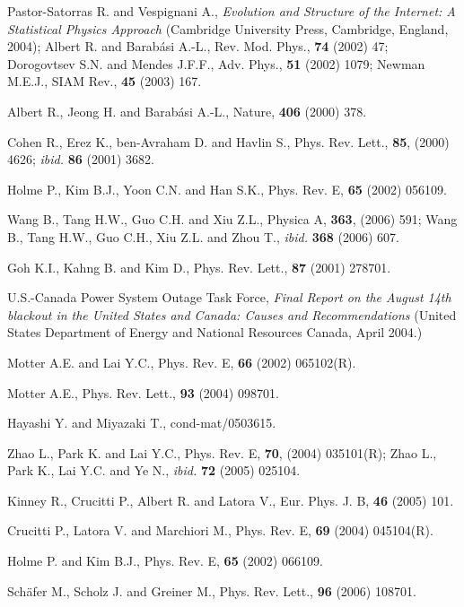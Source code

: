 \documentclass[doublecol]{epl2}
\begin{document}
\begin{thebibliography}{ref1}
Pastor-Satorras R. and Vespignani A., {\it Evolution and Structure
of the Internet: A Statistical Physics Approach} (Cambridge
University Press, Cambridge, England, 2004); Albert R. and
Barab\'{a}si A.-L., Rev. Mod. Phys., \textbf{74} (2002) 47;
Dorogovtsev S.N. and Mendes J.F.F., Adv. Phys., \textbf{51} (2002)
1079; Newman M.E.J., SIAM Rev., \textbf{45} (2003) 167.

Albert R., Jeong H. and Barab\'{a}si A.-L., Nature,
\textbf{406} (2000) 378.

Cohen R., Erez K., ben-Avraham D. and Havlin S., Phys.
Rev. Lett., \textbf{85}, (2000) 4626; {\it ibid.} \textbf{86} (2001)
3682.

Holme P., Kim B.J., Yoon C.N. and Han S.K., Phys. Rev.
E,
\textbf{65} (2002) 056109.

 Wang B., Tang H.W., Guo C.H. and Xiu Z.L.,
Physica A, \textbf{363}, (2006) 591; Wang B., Tang H.W., Guo C.H.,
Xiu Z.L. and Zhou T., {\it ibid.} \textbf{368} (2006) 607.

 Goh K.I., Kahng B. and Kim D., Phys. Rev. Lett.,
\textbf{87} (2001) 278701.

 U.S.-Canada Power System Outage Task Force,
{\it Final Report on the August 14th blackout in the United States
and Canada: Causes and Recommendations} (United States Department of
Energy and National Resources Canada, April 2004.)

 Motter A.E. and Lai Y.C., Phys. Rev. E, \textbf{66}
(2002) 065102(R).

 Motter A.E., Phys. Rev. Lett., \textbf{93} (2004) 098701.

Hayashi Y. and Miyazaki T., cond-mat/0503615.

 Zhao L., Park K. and Lai Y.C., Phys. Rev. E,
\textbf{70}, (2004) 035101(R); Zhao L., Park K., Lai Y.C. and Ye N.,
{\it ibid.} \textbf{72} (2005) 025104.

Kinney R., Crucitti P., Albert R. and Latora V.,
Eur. Phys. J. B, \textbf{46} (2005) 101.

Crucitti P., Latora V. and Marchiori M., Phys. Rev.
E,
\textbf{69} (2004) 045104(R).

Holme P. and Kim B.J., Phys. Rev. E, \textbf{65} (2002) 066109.

Sch\"{a}fer M., Scholz J. and Greiner M., Phys.
Rev. Lett., \textbf{96} (2006) 108701.


\end{thebibliography}
\end{document}
